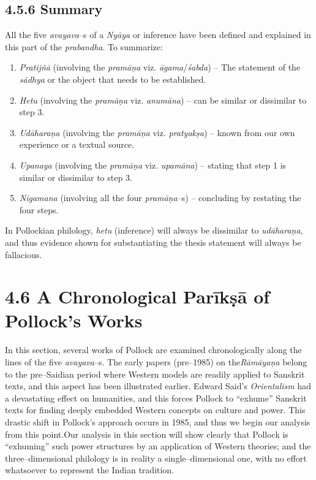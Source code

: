 \subsection*{4.5.6 Summary}

All the five \textit{avayava}–s of a \textit{Nyāya} or inference have been defined and explained in this part of the \textit{prabandha}. To summarize:

\begin{enumerate}
\itemsep=0pt
\item \textit{Pratijñā} (involving the \textit{pramāṇa }viz.\textit{ āgama}/\textit{śabda}) – The statement of the \textit{sādhya }or the object that needs to be established.

 \item \textit{Hetu} (involving the \textit{pramāṇa }viz.\textit{ anumāna}) – can be similar or dissimilar to step 3.

 \item \textit{Udāharaṇa} (involving the \textit{pramāṇa }viz.\textit{ pratyakṣa}) – known from our own experience or a textual source.

 \item \textit{Upanaya} (involving the \textit{pramāṇa }viz.\textit{ upamāna}) – stating that step 1 is similar or dissimilar to step 3.

 \item \textit{Nigamana} (involving all the four \textit{pramāṇa–}s) – concluding by restating the four steps.

\end{enumerate}

In Pollockian philology, \textit{hetu} (inference) will always be dissimilar to \textit{udāharaṇa,} and thus evidence shown for substantiating the thesis statement will always be fallacious.


\section*{4.6 A Chronological Parīkṣā of Pollock’s Works}

In this section, several works of Pollock are examined chronologically along the lines of the five \textit{avayava}–s. The early papers (pre–1985) on the\textit{Rāmāyaṇa} belong to the pre–Saidian period where Western models are readily applied to Sanskrit texts, and this aspect has been illustrated earlier. Edward Said’s \textit{Orientalism }had a devastating effect on humanities, and this forces Pollock to “exhume” Sanskrit texts for finding deeply embedded Western concepts on culture and power. This drastic shift in Pollock’s approach occurs in 1985, and thus we begin our analysis from this point.Our analysis in this section will show clearly that Pollock is “exhuming” such power structures by an application of Western theories; and the three–dimensional philology is in reality a single–dimensional one, with no effort whatsoever to represent the Indian tradition.

